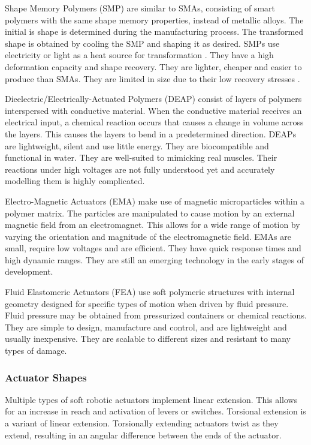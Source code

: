 Shape Memory Polymers (SMP) are similar to SMAs, consisting of smart polymers with the same shape memory properties, instead of metallic alloys. The initial is shape is determined during the manufacturing process. The transformed shape is obtained by cooling the SMP and shaping it as desired. SMPs use electricity or light as a heat source for transformation \cite{Behl2007}. They have a high deformation capacity and shape recovery. They are lighter, cheaper and easier to produce than SMAs. They are limited in size due to their low recovery stresses \cite{Rodriguez2016, Behl2007}.

Dieelectric/Electrically-Actuated Polymers (DEAP) consist of layers of polymers interspersed with conductive material. When the conductive material receives an electrical input, a chemical reaction occurs that causes a change in volume across the layers. This causes the layers to bend in a predetermined direction. DEAPs are lightweight, silent and use little energy. They are biocompatible and functional in water. They are well-suited to mimicking real muscles. Their reactions under high voltages are not fully understood yet and accurately modelling them is highly complicated. \cite{Mutlu2014}

Electro-Magnetic Actuators (EMA) make use of magnetic microparticles within a polymer matrix. The particles are manipulated to cause motion by an external magnetic field from an electromagnet. This allows for a wide range of motion by varying the orientation and magnitude of the electromagnetic field. EMAs are small, require low voltages and are efficient. They have quick response times and high dynamic ranges. They are still an emerging technology in the early stages of development. \cite{Do2018}

Fluid Elastomeric Actuators (FEA) use soft polymeric structures with internal geometry designed for specific types of motion when driven by fluid pressure. Fluid pressure may be obtained from pressurized containers or chemical reactions. They are simple to design, manufacture and control, and are lightweight and usually inexpensive. They are scalable to different sizes and resistant to many types of damage. \cite{Shepherd2011a,Onal2017}

\subsubsection{Actuator Shapes}

Multiple types of soft robotic actuators implement linear extension. This allows for an increase in reach and activation of levers or switches. Torsional extension is a variant of linear extension. Torsionally extending actuators twist as they extend, resulting in an angular difference between the ends of the actuator. \cite{Whitesides2018}

